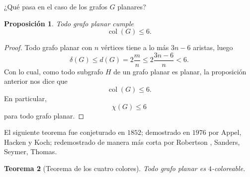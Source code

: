 \documentclass[12pt]{report}
\theoremstyle{plain}
\newtheorem{theorem}{Teorema}[section]
\newtheorem{proposition}[theorem]{Proposición}
\theoremstyle{definition}
\newcommand{\col}[1]{\operatorname{col} (#1)}
\begin{document}
¿Qué pasa en el caso de los grafos $G$ planares?

\begin{proposition}
Todo grafo planar cumple
\[
    \col G \leq 6.
\]
\end{proposition}
\begin{proof}
Todo grafo planar con $n$ vértices tiene a lo más $3n - 6$ aristas, luego
\[
    \delta (G) \leq d(G) = 2 \frac{m} n \leq 2 \frac{3 n - 6} n < 6.
\]
Con lo cual, como todo subgrafo $H$ de un grafo planar es planar, la proposición anterior nos dice que
\[
    \col G \leq 6.
\]
En particular,
\[
    \chi (G) \leq 6
\]
para todo grafo planar.
\end{proof}




El siguiente teorema fue conjeturado en $1852$; demostrado en $1976$ por Appel, Hacken y Koch; redemostrado de manera más corta por Robertson , Sanders, Seymer, Thomas.
\begin{theorem}[Teorema de los cuatro colores]
Todo grafo planar es $4$-coloreable.
\end{theorem}
\end{document}
